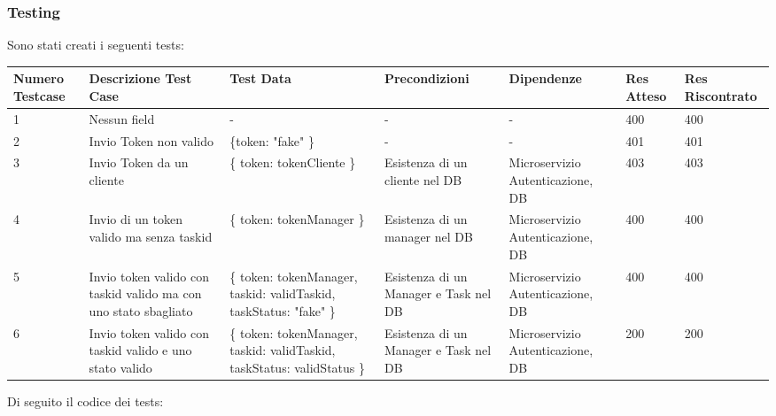 \documentclass{report}
\begin{document}
\subsubsection*{Testing}

Sono stati creati i seguenti tests:

\begin{center} %
	\centering
	\begin{tabular}{ |p{1cm}|p{2cm}|p{2cm}|p{2cm}|p{2cm}|p{1cm}|p{1cm}| }
		\hline
		Numero Testcase & Descrizione Test Case & Test Data & Precondizioni & Dipendenze & Res Atteso & Res Riscontrato \\
		\hline
		1 & Nessun field & - & - & - & 400 & 400 \\
		\hline
		2 & Invio Token non valido & \{token: "fake" \} & - & - & 401 & 401 \\
		\hline
		3 & Invio Token da un cliente & \{ token: tokenCliente \} & Esistenza di un cliente nel DB & Microservizio Autenticazione, DB & 403 & 403 \\
		\hline
		4 & Invio di un token valido ma senza taskid & \{ token: tokenManager \} & Esistenza di un manager nel DB & Microservizio Autenticazione, DB & 400 & 400 \\
		\hline
		5 & Invio token valido con taskid valido ma con uno stato sbagliato & \{ token: tokenManager, taskid: validTaskid, taskStatus: "fake" \} & Esistenza di un Manager e Task nel DB & Microservizio Autenticazione, DB & 400 & 400 \\
		\hline
		6 & Invio token valido con taskid valido e uno stato valido & \{ token: tokenManager, taskid: validTaskid, taskStatus: validStatus \} & Esistenza di un Manager e Task nel DB & Microservizio Autenticazione, DB & 200 & 200 \\
		\hline
	\end{tabular}
\end{center}

Di seguito il codice dei tests:
\end{document}
